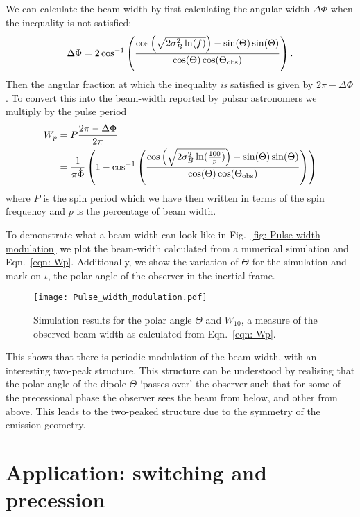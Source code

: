 \documentclass[../full_thesis/full_thesis.tex]{subfiles}
\begin{document}
We can calculate the beam width by first calculating the angular width $\Delta\Phi$
when the inequality is not satisfied:
\begin{equation}
    \Delta\Phi = 2\cos^{-1}\left(
                \frac{\cos\left(\sqrt{2\sigma_{B}^{2} \ln(f)}\right) - \sin(\Theta)\sin(\Theta)}
                          {\cos(\Theta)\cos(\Theta_{\mathrm{obs}})}
                      \right).
\end{equation}
Then the angular fraction at which the inequality \emph{is} satisfied is given by
$2\pi - \Delta\Phi$. To convert this into the beam-width reported by pulsar
astronomers we multiply by the pulse period
\begin{align}
    W_{p} & = P \frac{2\pi - \Delta\Phi}{2\pi}\\
          & = \frac{1}{\pi \dot{\Phi}}\left(1 -
               \cos^{-1}\left(
                   \frac{\cos\left(\sqrt{2\sigma_{B}^{2} \ln(\frac{100}{p})}\right) - \sin(\Theta)\sin(\Theta)}
                          {\cos(\Theta)\cos(\Theta_{\mathrm{obs}})}
                      \right)
                  \right)
\label{eqn: Wp}
\end{align}
where $P$ is the spin period which we have then written in terms of the spin
frequency and $p$ is the percentage of beam width.

To demonstrate what a beam-width can look like in Fig.~\ref{fig: Pulse width
modulation} we plot the beam-width calculated from a numerical simulation and
Eqn.~\eqref{eqn: Wp}. Additionally, we show the variation of $\Theta$ for the
simulation and mark on $\iota$, the polar angle of the observer in the inertial
frame.
\begin{figure}[ht]
\centering
\texttt{[image: Pulse\_width\_modulation.pdf]}
\caption{Simulation results for the polar angle $\Theta$ and $W_{10}$, a
measure of the observed beam-width as calculated from Eqn.~\eqref{eqn: Wp}.}
\label{fig: Pulse width modulation}
\end{figure}
This shows that there is periodic modulation of the beam-width, with an
interesting two-peak structure. This structure can be understood by realising
that the polar angle of the dipole $\Theta$ `passes over' the observer such
that for some of the precessional phase the observer sees the beam from below,
and other from above. This leads to the two-peaked structure due to the
symmetry of the emission geometry.


\section{Application: switching and precession}
\end{document}
